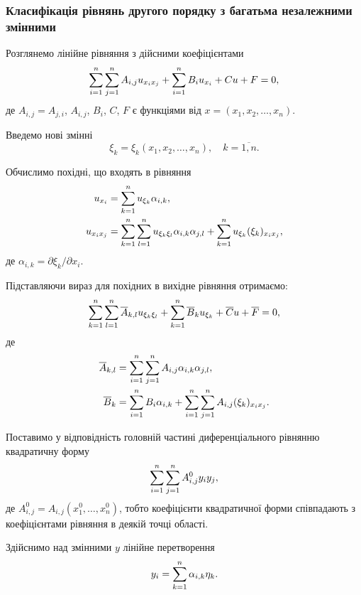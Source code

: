 \subsubsection{Класифікація рівнянь другого порядку з багатьма незалежними змінними}

Розглянемо лінійне рівняння з дійсними коефіцієнтами
\begin{equation}
	\displaystyle\sum\limits_{i=1}^n \displaystyle\sum\limits_{j=1}^n A_{i,j} u_{x_i x_j} + \displaystyle\sum\limits_{i=1}^n B_i u_{x_i} + Cu + F = 0,
\end{equation}
де $A_{i,j} = A_{j,i}$, $A_{i,j}$, $B_i$, $C$, $F$ є функціями від $x = (x_1, x_2, \ldots, x_n)$. \medskip

Введемо нові змінні
\begin{equation}
	\xi_k = \xi_k(x_1, x_2, \ldots, x_n), \quad k = \overline{1, n}.
\end{equation}

Обчислимо похідні, що входять в рівняння
\begin{align}
	u_{x_i} &= \displaystyle\sum\limits_{k=1}^n u_{\xi_k} \alpha_{i,k}, \\
	u_{x_i x_j} &= \displaystyle\sum\limits_{k=1}^n \displaystyle\sum\limits_{l=1}^n u_{\xi_k\xi_l} \alpha_{i,k}\alpha_{j,l} + \displaystyle\sum\limits_{k=1}^n u_{\xi_k} (\xi_k)_{x_ix_j},
\end{align}
де $\alpha_{i,k}=\partial\xi_k/\partial x_i$. \medskip

Підставляючи вираз для похідних в вихідне рівняння отримаємо:
\begin{equation}
	\displaystyle\sum\limits_{k=1}^n \displaystyle\sum\limits_{l=1}^n \overline{A}_{k,l} u_{\xi_k\xi_l} + \displaystyle\sum\limits_{k=1}^n \overline{B}_k u_{\xi_k} + \overline{C} u + \overline{F} = 0,
\end{equation}
де
\begin{align}
	\overline{A}_{k,l} &= \displaystyle\sum\limits_{i=1}^n \displaystyle\sum\limits_{j=1}^n A_{i,j}\alpha_{i,k}\alpha_{j,l}, \\
	\overline{B}_k &= \displaystyle\sum\limits_{i=1}^n B_i \alpha_{i,k} + \displaystyle\sum\limits_{i=1}^n \displaystyle\sum\limits_{j=1}^n A_{i,j}(\xi_k)_{x_ix_j}.
\end{align}

Поставимо у відповідність головній частині диференціального рівнянню квадратичну форму
\begin{equation}
	\displaystyle\sum\limits_{i=1}^n \displaystyle\sum\limits_{j=1}^n A_{i,j}^0 y_iy_j,
\end{equation}
де $A_{i,j}^0=A_{i,j}(x_1^0,\ldots,x_n^0)$, тобто коефіцієнти квадратичної форми співпадають з коефіцієнтами рівняння в деякій точці області. \medskip

Здійснимо над змінними $y$ лінійне перетворення
\begin{equation}
	y_i = \displaystyle\sum\limits_{k=1}^n \alpha_{i,k} \eta_k.
\end{equation}

